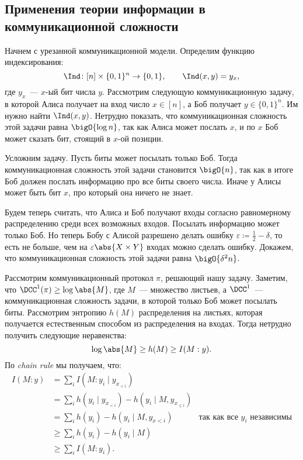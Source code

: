 \subsection{Применения теории информации в коммуникационной сложности}

Начнем с урезанной коммуникационной модели. Определим функцию индексирования:
$$
    \Ind\colon [n] \times \{0,1\}^n \to \{0, 1\},\qquad \Ind(x, y) = y_x,
$$ 
где $y_x$~--- $x$-ый бит числа $y$. Рассмотрим следующую коммуникационную задачу, в которой Алиса
получает на вход число $x \in [n]$, а Боб получает $y \in \{0,1\}^n$. Им нужно найти
$\Ind(x, y)$. Нетрудно показать, что коммуникационная сложность этой задачи равна $\bigO{\log n}$, так как
Алиса может послать $x$, и по $x$ Боб может сказать бит, стоящий в $x$-ой позиции.

Усложним задачу. Пусть биты может посылать только Боб. Тогда коммуникационная сложность этой задачи
становится $\bigO{n}$, так как в итоге Боб должен послать информацию про все биты своего числа. Иначе у
Алисы может быть бит $x$, про который она ничего не знает.

Будем теперь считать, что Алиса и Боб получают входы согласно равномерному распределению среди всех
возможных входов. Посылать информацию может только Боб. Но теперь Бобу с Алисой разрешено делать ошибку
$\varepsilon \coloneqq \frac{1}{2} - \delta$, то есть не больше, чем на $\varepsilon \abs{X \times Y}$
входах можно сделать ошибку. Докажем, что коммуникационная сложность этой задачи равна
$\bigO{\delta^2 n}$. 

Рассмотрим коммуникационный протокол $\pi$, решающий нашу задачу. Заметим, что $\DCC^1(\pi) \ge \log
\abs{M}$, где $M$~--- множество листьев, а $\DCC^1$~--- коммуникационная сложность задачи, в 
которой только Боб может посылать биты. Рассмотрим энтропию $h(M)$ распределения на листьях, которая 
получается естественным способом из распределения на входах. Тогда нетрудно получить следующие
неравенства: 
$$
    \log{\abs{M}} \ge h(M) \ge I(M:y).
$$ 
По \textit{chain rule} мы получаем, что:
\begin{align*}
    I(M:y) &= \sum_i I(M:y_i \mid y_{x_{< i}})\\
           &= \sum_i h(y_i \mid y_{x_{< i}}) - h(y_i \mid M, y_{x_{\le i}})\\
           &= \sum_i h(y_i) - h(y_i \mid M, y_{x < i}) & \text{так как все $y_i$ независимы}\\
           &\ge \sum_i h(y_i) - h(y_i \mid M)\\
           &\ge \sum_i I(M : y_i).
\end{align*}

